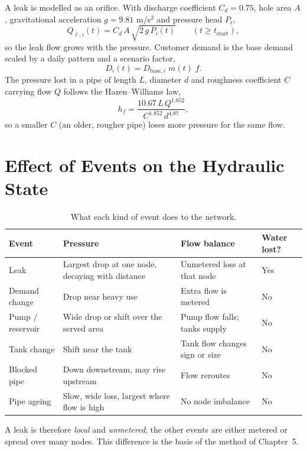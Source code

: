 \documentclass[11pt,letterpaper]{report}
\theoremstyle{definition}
\theoremstyle{plain}
\theoremstyle{remark}
\begin{document}
A leak is modelled as an orifice. With discharge coefficient $C_d=0.75$, hole area $A$, gravitational acceleration $g=9.81$ m/s$^2$ and pressure head $P_i$,
\begin{equation}\label{eq:orifice}
Q_{\ell,i}(t)=C_d\,A\,\sqrt{2\,g\,P_i(t)}\qquad (t\ge t_{\text{start}}),
\end{equation}
so the leak flow grows with the pressure. Customer demand is the base demand scaled by a daily pattern and a scenario factor,
\begin{equation}\label{eq:demand}
D_i(t)=D_{\text{base},i}\;m(t)\;f .
\end{equation}
The pressure lost in a pipe of length $L$, diameter $d$ and roughness coefficient $C$ carrying flow $Q$ follows the Hazen--Williams law,
\begin{equation}\label{eq:hw}
h_f=\frac{10.67\,L\,Q^{1.852}}{C^{1.852}\,d^{4.87}} ,
\end{equation}
so a smaller $C$ (an older, rougher pipe) loses more pressure for the same flow.

\section{Effect of Events on the Hydraulic State}
\begin{table}[H]
\centering\small
\caption{What each kind of event does to the network.}\label{tab:effects}
\begin{tabularx}{\textwidth}{@{}p{0.95in}YYp{0.8in}@{}}
\toprule
Event & Pressure & Flow balance & Water lost? \\
\midrule
Leak & Largest drop at one node, decaying with distance & Unmetered loss at that node & Yes \\
Demand change & Drop near heavy use & Extra flow is metered & No \\
Pump / reservoir & Wide drop or shift over the served area & Pump flow falls; tanks supply & No \\
Tank change & Shift near the tank & Tank flow changes sign or size & No \\
Blocked pipe & Down downstream, may rise upstream & Flow reroutes & No \\
Pipe ageing & Slow, wide loss, largest where flow is high & No node imbalance & No \\
\bottomrule
\end{tabularx}
\end{table}
A leak is therefore \emph{local} and \emph{unmetered}; the other events are either metered or spread over many nodes. This difference is the basis of the method of Chapter~5.
\end{document}
